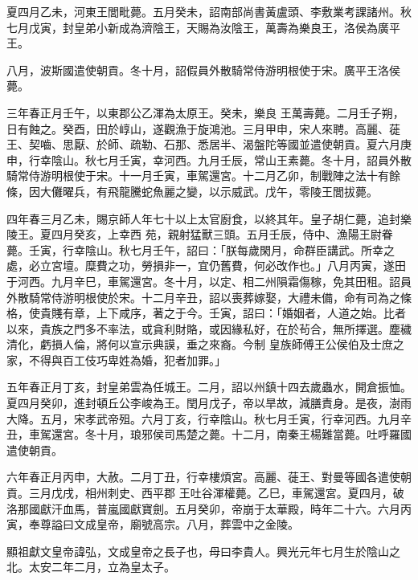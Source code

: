 \begin{pinyinscope}
 夏四月乙未，河東王閭毗薨。五月癸未，詔南部尚書黃盧頭、李敷業考課諸州。秋七月戊寅，封皇弟小新成為濟陰王，天賜為汝陰王，萬壽為樂良王，洛侯為廣平王。



 八月，波斯國遣使朝貢。冬十月，詔假員外散騎常侍游明根使于宋。廣平王洛侯薨。



 三年春正月壬午，以東郡公乙渾為太原王。癸未，樂良
 王萬壽薨。二月壬子朔，日有蝕之。癸酉，田於崞山，遂觀漁于旋鴻池。三月甲申，宋人來聘。高麗、蓰王、契嚙、思厭、於師、疏勒、石那、悉居半、渴盤陀等國並遣使朝貢。夏六月庚申，行幸陰山。秋七月壬寅，幸河西。九月壬辰，常山王素薨。冬十月，詔員外散騎常侍游明根使于宋。十一月壬寅，車駕還宮。十二月乙卯，制戰陣之法十有餘條，因大儺曜兵，有飛龍騰蛇魚麗之變，以示威武。戊午，零陵王閭拔薨。



 四年春三月乙未，賜京師人年七十以上太官廚食，以終其年。皇子胡仁薨，追封樂陵王。夏四月癸亥，上幸西
 苑，親射猛獸三頭。五月壬辰，侍中、漁陽王尉眷薨。壬寅，行幸陰山。秋七月壬午，詔曰：「朕每歲閑月，命群臣講武。所幸之處，必立宮壇。糜費之功，勞損非一，宜仍舊費，何必改作也。」八月丙寅，遂田于河西。九月辛巳，車駕還宮。冬十月，以定、相二州隕霜傷稼，免其田租。詔員外散騎常侍游明根使於宋。十二月辛丑，詔以喪葬嫁娶，大禮未備，命有司為之條格，使貴賤有章，上下咸序，著之于今。壬寅，詔曰：「婚姻者，人道之始。比者以來，貴族之門多不率法，或貪利財賂，或因緣私好，在於茍合，無所擇選。塵穢清化，虧損人倫，將何以宣示典謨，垂之來裔。今制
 皇族師傅王公侯伯及士庶之家，不得與百工伎巧卑姓為婚，犯者加罪。」



 五年春正月丁亥，封皇弟雲為任城王。二月，詔以州鎮十四去歲蟲水，開倉振恤。夏四月癸卯，進封頓丘公李峻為王。閏月戊子，帝以旱故，減膳責身。是夜，澍雨大降。五月，宋孝武帝殂。六月丁亥，行幸陰山。秋七月壬寅，行幸河西。九月辛丑，車駕還宮。冬十月，琅邪侯司馬楚之薨。十二月，南秦王楊難當薨。吐呼羅國遣使朝貢。



 六年春正月丙申，大赦。二月丁丑，行幸樓煩宮。高麗、蓰王、對曼等國各遣使朝貢。三月戊戌，相州刺史、西平郡
 王吐谷渾權薨。乙巳，車駕還宮。夏四月，破洛那國獻汗血馬，普嵐國獻寶劍。五月癸卯，帝崩于太華殿，時年二十六。六月丙寅，奉尊謚曰文成皇帝，廟號高宗。八月，葬雲中之金陵。



 顯祖獻文皇帝諱弘，文成皇帝之長子也，母曰李貴人。興光元年七月生於陰山之北。太安二年二月，立為皇太子。




\end{pinyinscope}
